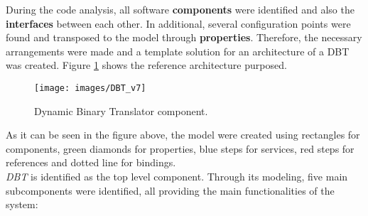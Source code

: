 
During the code analysis, all software \textbf{components} were identified and also the \textbf{interfaces} between each other. In additional, several configuration points were found and transposed to the model through \textbf{properties}. Therefore, the necessary arrangements were made and a template solution for an architecture of a DBT was created. Figure \ref{fig:DBT_component} shows the reference architecture purposed.

\begin{figure}[!htb]
\centerline{
\texttt{[image: images/DBT\_v7]}
}
\caption{Dynamic Binary Translator component.}
\label{fig:DBT_component} 
\end{figure}

As it can be seen in the figure above, the model were created using rectangles for components, green diamonds for properties, blue steps for services, red steps for references and dotted line for bindings. \\ 

\textit{DBT} is identified as the top level component. Through its modeling, five main subcomponents were identified, all providing the main functionalities of the system: 

